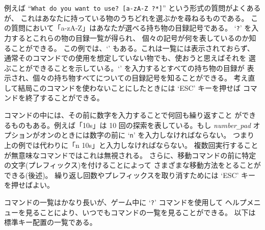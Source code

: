 例えば
``{\tt What do you want to use? [a-zA-Z\ ?*]}'' という形式の質問がよくあるが、
これはあなたに持っている物のうちどれを選ぶかを尋ねるものである。
この質問において「a-zA-Z」はあなたが選べる持ち物の目録記号である。
`{\tt ?}' を入力するとこれらの物の目録一覧が得られ、
個々の記号が何を表しているのか知ることができる。
この例では、`{\tt *}' もある。これは一覧には表示されておらず、
通常そのコマンドでの使用を想定していない物でも、使おうと思えばそれを
選ぶことができることを示している。`{\tt *}' を入力するとすべての持ち物の目録が
表示され、個々の持ち物すべてについての目録記号を知ることができる。
考え直して結局このコマンドを使わないことにしたときには `ESC' キーを押せば
コマンドを終了することができる。

コマンドの中には、その前に数字を入力することで何回も繰り返すこと
ができるものもある。例えば「10s」は 10 回の探索を表している。もし
{\it number\verb+_+pad\/}
オプションがオンのときには数字の前に `{\tt n}' を入力しなければならない。
つまり上の例では代わりに「n 10s」と入力しなければならない。
複数回実行することが無意味なコマンドではこれは無視される。
さらに、移動コマンドの前に特定の文字(プレフィックス)を付けることによって
さまざまな移動方法をとることができる(後述)。
繰り返し回数やプレフィックスを取り消すためには `ESC' キーを押せばよい。

コマンドの一覧はかなり長いが、ゲーム中に `{\tt ?}' コマンドを使用して
ヘルプメニューを見ることにより、いつでもコマンドの一覧を見ることができる。
以下は標準キー配置の一覧である。

